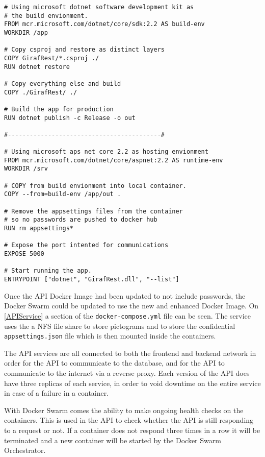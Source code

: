 \begin{lstlisting}[caption={API Dockerfile},captionpos=b,label=APIDockerfile,escapechar=\%]
# Using microsoft dotnet software development kit as 
# the build envionment.
FROM mcr.microsoft.com/dotnet/core/sdk:2.2 AS build-env
WORKDIR /app

# Copy csproj and restore as distinct layers
COPY GirafRest/*.csproj ./
RUN dotnet restore

# Copy everything else and build
COPY ./GirafRest/ ./

# Build the app for production
RUN dotnet publish -c Release -o out

#------------------------------------------#

# Using microsoft aps net core 2.2 as hosting envionment
FROM mcr.microsoft.com/dotnet/core/aspnet:2.2 AS runtime-env
WORKDIR /srv

# COPY from build envionment into local container.
COPY --from=build-env /app/out .

# Remove the appsettings files from the container 
# so no passwords are pushed to docker hub
RUN rm appsettings*

# Expose the port intented for communications
EXPOSE 5000

# Start running the app.
ENTRYPOINT ["dotnet", "GirafRest.dll", "--list"]
\end{lstlisting}

Once the API Docker Image had been updated to not include passwords, the Docker Swarm could be updated to use the new and enhanced Docker Image. 
On \autoref{APIService} a section of the \lstinline$docker-compose.yml$ file can be seen.
The service uses the a NFS file share to store pictograms and to store the confidential \lstinline$appsettings.json$ file which is then mounted inside the containers.

The API services are all connected to both the frontend and backend network in order for the API to communicate to the database, and for the API to communicate to the internet via a reverse proxy. 
Each version of the API does have three replicas of each service, in order to void downtime on the entire service in case of a failure in a container.

With Docker Swarm comes the ability to make ongoing health checks on the containers. 
This is used in the API to check whether the API is still responding to a request or not.
If a container does not respond three times in a row it will be terminated and a new container will be started by the Docker Swarm Orchestrator.

